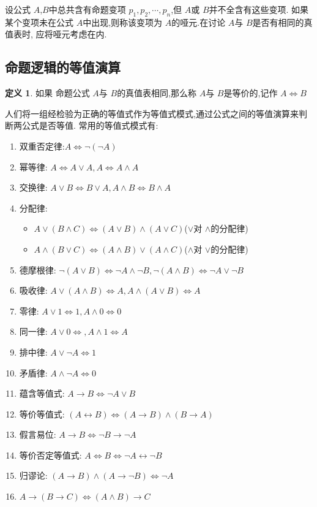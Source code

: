 \documentclass[a4paper,11pt]{article}%
\theoremstyle{remark}
\theoremstyle{remark}
\theoremstyle{definition}
\theoremstyle{definition}
\newtheorem*{definition}{定义}
\theoremstyle{plain}
\begin{document}
设公式 $A$,$B$中总共含有命题变项 $p_1,p_2,\cdots,p_n$,但 $A$或 $B$并不全含有这些变项.
如果某个变项未在公式 $A$中出现,则称该变项为 $A$的哑元.在讨论 $A$与 $B$是否有相同的真值表时,
应将哑元考虑在内.

\subsection{命题逻辑的等值演算}
\begin{definition}
    如果 命题公式 $A$与 $B$的真值表相同,那么称 $A$与 $B$是等价的,记作 $A\Leftrightarrow B$
\end{definition}
人们将一组经检验为正确的等值式作为等值式模式,通过公式之间的等值演算来判断两公式是否等值.
常用的等值式模式有:
\begin{enumerate}
    \item 双重否定律:$A\Leftrightarrow \lnot(\lnot A)$
    \item 幂等律: $A\Leftrightarrow A\lor A,A\Leftrightarrow A\land A$
    \item 交换律: $A\lor B\Leftrightarrow B\lor A,A\land B\Leftrightarrow B\land A$
    \item 分配律: 
    \begin{itemize}
        \item $A\lor(B\land C)\Leftrightarrow (A\lor B)\land(A\lor C)$($\lor$对 $\land$的分配律)
        \item $A\land(B\lor C)\Leftrightarrow (A\land B)\lor(A\land C)$($\land$对 $\lor$的分配律)
    \end{itemize}
    \item 德摩根律: $\lnot(A\lor B)\Leftrightarrow \lnot A\land \lnot B,\lnot(A\land B)\Leftrightarrow\lnot A \lor \lnot B$
    \item 吸收律: $A\lor(A\land B)\Leftrightarrow A,A\land(A\lor B)\Leftrightarrow A$
    \item 零律: $A\lor 1\Leftrightarrow 1, A\land 0\Leftrightarrow 0$
    \item 同一律: $A\lor 0\Leftrightarrow,A\land 1\Leftrightarrow A$
    \item 排中律: $A\lor\lnot A\Leftrightarrow 1$
    \item 矛盾律: $A\land \lnot A\Leftrightarrow 0$
    \item 蕴含等值式: $A\rightarrow B\Leftrightarrow\lnot A \lor B$
    \item 等价等值式: $(A\leftrightarrow B)\Leftrightarrow(A\rightarrow B)\land(B\rightarrow A)$
    \item 假言易位: $A\rightarrow B\Leftrightarrow \lnot B\rightarrow\lnot A$
    \item 等价否定等值式: $A\Leftrightarrow B\Leftrightarrow \lnot A\leftrightarrow\lnot B$
    \item 归谬论: $(A\rightarrow B)\land (A\rightarrow\lnot B)\Leftrightarrow \lnot A$
    \item $A\rightarrow(B\rightarrow C)\Leftrightarrow(A\land B)\rightarrow C$
\end{enumerate}
\end{document}
